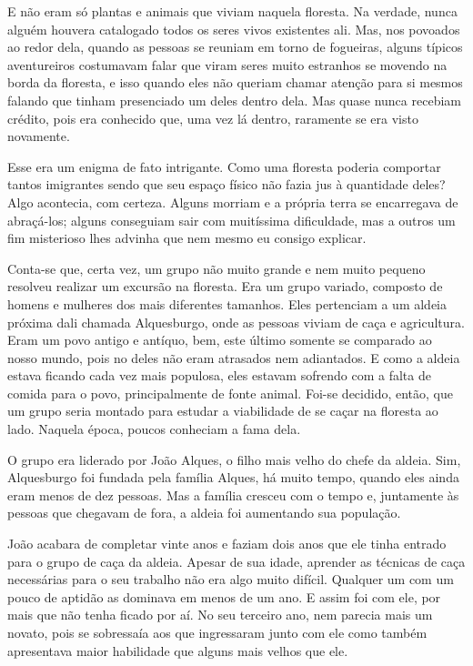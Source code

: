 E não eram só plantas e animais que viviam naquela floresta. Na verdade, nunca alguém houvera catalogado todos os seres vivos existentes ali. Mas, nos povoados ao redor dela, quando as pessoas se reuniam em torno de fogueiras, alguns típicos aventureiros costumavam falar que viram seres muito estranhos se movendo na borda da floresta, e isso quando eles não queriam chamar atenção para si mesmos falando que tinham presenciado um deles dentro dela. Mas quase nunca recebiam crédito, pois era conhecido que, uma vez lá dentro, raramente se era visto novamente.

Esse era um enigma de fato intrigante. Como uma floresta poderia comportar tantos imigrantes sendo que seu espaço físico não fazia jus à quantidade deles? Algo acontecia, com certeza. Alguns morriam e a própria terra se encarregava de abraçá-los; alguns conseguiam sair com muitíssima dificuldade, mas a outros um fim misterioso lhes advinha que nem mesmo eu consigo explicar.

Conta-se que, certa vez, um grupo não muito grande e nem muito pequeno resolveu realizar um excursão na floresta. Era um grupo variado, composto de homens e mulheres dos mais diferentes tamanhos. Eles pertenciam a um aldeia próxima dali chamada Alquesburgo, onde as pessoas viviam de caça e agricultura. Eram um povo antigo e antíquo, bem, este último somente se comparado ao nosso mundo, pois no deles não eram atrasados nem adiantados. E como a aldeia estava ficando cada vez mais populosa, eles estavam sofrendo com a falta de comida para o povo, principalmente de fonte animal. Foi-se decidido, então, que um grupo seria montado para estudar a viabilidade de se caçar na floresta ao lado. Naquela época, poucos conheciam a fama dela.

O grupo era liderado por João Alques, o filho mais velho do chefe da aldeia. Sim, Alquesburgo foi fundada pela família Alques, há muito tempo, quando eles ainda eram menos de dez pessoas. Mas a família cresceu com o tempo e, juntamente às pessoas que chegavam de fora, a aldeia foi aumentando sua população.

João acabara de completar vinte anos e faziam dois anos que ele tinha entrado para o grupo de caça da aldeia. Apesar de sua idade, aprender as técnicas de caça necessárias para o seu trabalho não era algo muito difícil. Qualquer um com um pouco de aptidão as dominava em menos de um ano. E assim foi com ele, por mais que não tenha ficado por aí. No seu terceiro ano, nem parecia mais um novato, pois se sobressaía aos que ingressaram junto com ele como também apresentava maior habilidade que alguns mais velhos que ele.

